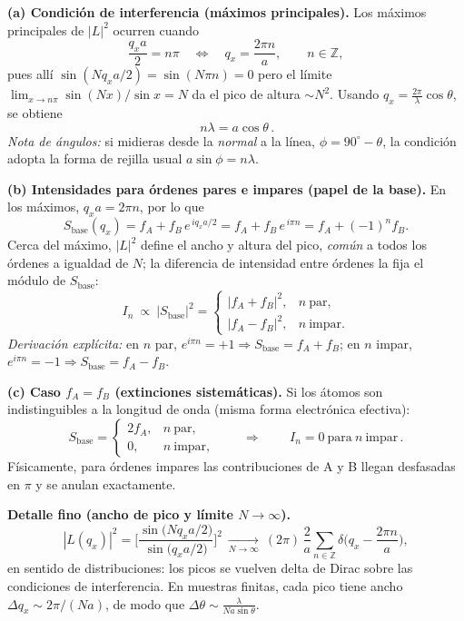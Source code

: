 \documentclass{article}
\begin{document}
\bigskip
\textbf{(a) Condición de interferencia (máximos principales).}  
Los máximos principales de \( |L|^2 \) ocurren cuando
\[
\frac{q_x a}{2}=n\pi \quad\Longleftrightarrow\quad q_x=\frac{2\pi n}{a},\qquad n\in\mathbb{Z},
\]
pues allí \(\sin(N q_x a/2)=\sin(N\pi n)=0\) pero el límite \(\lim_{x\to n\pi}\sin(Nx)/\sin x=N\) da el pico de altura \(\sim N^2\).  
Usando \(q_x=\tfrac{2\pi}{\lambda}\cos\theta\), se obtiene
\[
\boxed{\,n\lambda=a\cos\theta\,}.
\]
\emph{Nota de ángulos:} si midieras desde la \emph{normal} a la línea, \(\phi=90^\circ-\theta\), la condición adopta la forma de rejilla usual \(a\sin\phi=n\lambda\).

\bigskip
\textbf{(b) Intensidades para órdenes pares e impares (papel de la base).}  
En los máximos, \(q_x a=2\pi n\), por lo que
\[
S_{\text{base}}(q_x)=f_A+f_B\,e^{\,i q_x a/2}=f_A+f_B\,e^{\,i\pi n}=f_A+(-1)^n f_B.
\]
Cerca del máximo, \(|L|^2\) define el ancho y altura del pico, \emph{común} a todos los órdenes a igualdad de \(N\); la diferencia de intensidad entre órdenes la fija el módulo de \(S_{\text{base}}\):
\[
\boxed{\,I_n \ \propto\ |S_{\text{base}}|^2=
\begin{cases}
|f_A+f_B|^2, & n\ \text{par},\\[3pt]
|f_A-f_B|^2, & n\ \text{impar}.
\end{cases}\,}
\]
\emph{Derivación explícita:} en \(n\) par, \(e^{i\pi n}=+1\Rightarrow S_{\text{base}}=f_A+f_B\); en \(n\) impar, \(e^{i\pi n}=-1\Rightarrow S_{\text{base}}=f_A-f_B\).

\bigskip
\textbf{(c) Caso \(f_A=f_B\) (extinciones sistemáticas).}  
Si los átomos son indistinguibles a la longitud de onda (misma forma electrónica efectiva):
\[
S_{\text{base}}=
\begin{cases}
2f_A, & n\ \text{par},\\
0, & n\ \text{impar},
\end{cases}
\qquad\Longrightarrow\qquad
\boxed{\,I_n=0\ \text{para}\ n\ \text{impar}\,}.
\]
Físicamente, para órdenes impares las contribuciones de A y B llegan desfasadas en \(\pi\) y se anulan exactamente.

\bigskip
\textbf{Detalle fino (ancho de pico y límite \(N\to\infty\)).}  
\[
|L(q_x)|^2=\Bigg[\frac{\sin\!\big(N q_x a/2\big)}{\sin\!\big(q_x a/2\big)}\Bigg]^2
\ \xrightarrow[N\to\infty]{}\ 
(2\pi)\,\frac{2}{a}\sum_{n\in\mathbb{Z}}\delta\!\Big(q_x-\frac{2\pi n}{a}\Big),
\]
en sentido de distribuciones: los picos se vuelven delta de Dirac sobre las condiciones de interferencia. En muestras finitas, cada pico tiene ancho \(\Delta q_x\sim 2\pi/(Na)\), de modo que \(\Delta\theta\sim \frac{\lambda}{Na\sin\theta}\).
\end{document}
